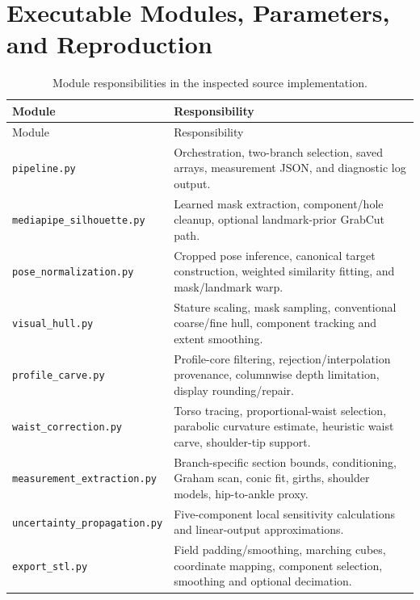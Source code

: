 \documentclass[11pt,a4paper]{article}
\numberwithin{equation}{section}
\begin{document}
\appendix
\section{Executable Modules, Parameters, and Reproduction}
\label{app:reproduction}
\begin{longtable}{L{5.4cm}L{9.3cm}}
\caption{Module responsibilities in the inspected source implementation.}\label{tab:modules}\\
\toprule
Module & Responsibility \\
\midrule
\endfirsthead
\toprule Module & Responsibility \\
\midrule
\endhead
\bottomrule\endfoot
\nolinkurl{pipeline.py} & Orchestration, two-branch selection, saved arrays, measurement JSON, and diagnostic log output. \\
\nolinkurl{mediapipe_silhouette.py} & Learned mask extraction, component/hole cleanup, optional landmark-prior GrabCut path. \\
\nolinkurl{pose_normalization.py} & Cropped pose inference, canonical target construction, weighted similarity fitting, and mask/landmark warp. \\
\nolinkurl{visual_hull.py} & Stature scaling, mask sampling, conventional coarse/fine hull, component tracking and extent smoothing. \\
\nolinkurl{profile_carve.py} & Profile-core filtering, rejection/interpolation provenance, columnwise depth limitation, display rounding/repair. \\
\nolinkurl{waist_correction.py} & Torso tracing, proportional-waist selection, parabolic curvature estimate, heuristic waist carve, shoulder-tip support. \\
\nolinkurl{measurement_extraction.py} & Branch-specific section bounds, conditioning, Graham scan, conic fit, girths, shoulder models, hip-to-ankle proxy. \\
\nolinkurl{uncertainty_propagation.py} & Five-component local sensitivity calculations and linear-output approximations. \\
\nolinkurl{export_stl.py} & Field padding/smoothing, marching cubes, coordinate mapping, component selection, smoothing and optional decimation. \\
\end{longtable}
\end{document}
